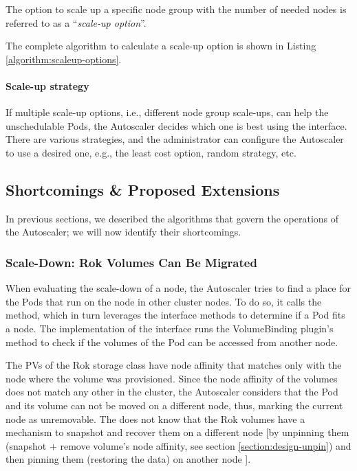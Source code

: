The option to scale up a specific node group with the number of needed nodes is
referred to as a ``\textit{scale-up option}''.

The complete algorithm to calculate a scale-up option is shown in Listing
\ref{algorithm:scaleup-options}.

\paragraph*{Scale-up strategy}

If multiple scale-up options, i.e., different node group scale-ups, can help the
unschedulable Pods, the Autoscaler decides which one is best using the
 interface. There are various strategies, and the administrator can
configure the Autoscaler to use a desired one, e.g., the least cost option,
random strategy, etc.




\clearpage
\subsection{Shortcomings \& Proposed Extensions}

In previous sections, we described the algorithms that govern the operations of
the Autoscaler; we will now identify their shortcomings.

\subsubsection{Scale-Down: Rok Volumes Can Be Migrated}
\label{section:design-autoscaler-unpinned}

When evaluating the scale-down of a node, the Autoscaler tries to find a place
for the Pods that run on the node in other cluster nodes. To do so, it calls the
 method, which in turn leverages the 
interface methods to determine if a Pod fits a node. The
 implementation of the interface runs the
VolumeBinding plugin's  method to check if the volumes of the Pod
can be accessed from another node.


The PVs of the Rok storage class have node affinity that matches only with the
node where the volume was provisioned. Since the node affinity of the volumes
does not match any other in the cluster, the Autoscaler considers that the Pod
and its volume can not be moved on a different node, thus, marking the current
node as unremovable. The  does not know that
the Rok volumes have a mechanism to snapshot and recover them on a different
node [by unpinning them (snapshot + remove volume's node affinity, see section
            \ref{section:design-unpin}) and then pinning them (restoring the data) on
            another node ].

